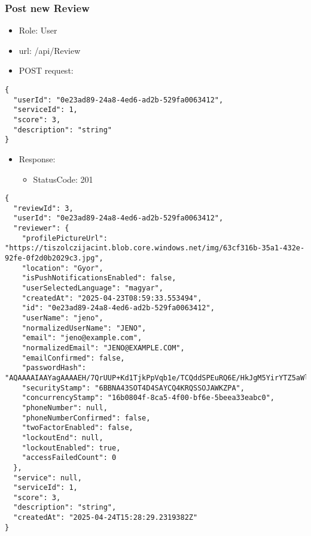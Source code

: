 \documentclass[11pt]{article}
\begin{document}
\subsubsection{Post new Review}
\label{sec:org1edc05c}
\begin{itemize}
\item Role: User
\item url: /api/Review
\item POST request:
\end{itemize}
\begin{verbatim}
{
  "userId": "0e23ad89-24a8-4ed6-ad2b-529fa0063412",
  "serviceId": 1,
  "score": 3,
  "description": "string"
}
\end{verbatim}
\begin{itemize}
\item Response:
\begin{itemize}
\item StatusCode: 201
\end{itemize}
\end{itemize}
\begin{verbatim}
{
  "reviewId": 3,
  "userId": "0e23ad89-24a8-4ed6-ad2b-529fa0063412",
  "reviewer": {
    "profilePictureUrl": "https://tiszolczijacint.blob.core.windows.net/img/63cf316b-35a1-432e-92fe-0f2d0b2029c3.jpg",
    "location": "Gyor",
    "isPushNotificationsEnabled": false,
    "userSelectedLanguage": "magyar",
    "createdAt": "2025-04-23T08:59:33.553494",
    "id": "0e23ad89-24a8-4ed6-ad2b-529fa0063412",
    "userName": "jeno",
    "normalizedUserName": "JENO",
    "email": "jeno@example.com",
    "normalizedEmail": "JENO@EXAMPLE.COM",
    "emailConfirmed": false,
    "passwordHash": "AQAAAAIAAYagAAAAEH/7QrUUP+Kd1TjkPpVqb1e/TCQddSPEuRQ6E/HkJgM5YirYTZ5aWl5VpLLPzyJ/ZQ==",
    "securityStamp": "6BBNA43SOT4D4SAYCQ4KRQSSOJAWKZPA",
    "concurrencyStamp": "16b0804f-8ca5-4f00-bf6e-5beea33eabc0",
    "phoneNumber": null,
    "phoneNumberConfirmed": false,
    "twoFactorEnabled": false,
    "lockoutEnd": null,
    "lockoutEnabled": true,
    "accessFailedCount": 0
  },
  "service": null,
  "serviceId": 1,
  "score": 3,
  "description": "string",
  "createdAt": "2025-04-24T15:28:29.2319382Z"
}
\end{verbatim}
\end{document}
